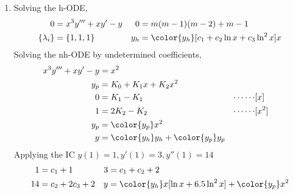 \begin{enumerate}
    \item Solving the h-ODE,
          \begin{align}
              0               & = x^{3}y''' + xy' - y                            &
              0               & = m(m-1) (m-2) + m - 1                             \\
              \{\lambda_{i}\} & = \{1, 1, 1\}                                    &
              y_{h}           & = \color{y_h} [c_1 + c_2 \ln x + c_3 \ln^{2}x] x
          \end{align}
          Solving the nh-ODE by undetermined coefficients,
          \begin{align}
              x^{3}y''' + xy' - y & = x^{2}                                       \\
              y_{p}               & = K_0 + K_1 x + K_2 x^{2}                     \\
              0                   & = K_1 - K_1                                 &
              \cdots\cdots        & [x]                                           \\
              1                   & = 2K_2 - K_2                                &
              \cdots\cdots        & [x^{2}]                                       \\
              y_{p}               & = \color{y_p} x^{2}                           \\
              y                   & = {\color{y_h} y_{h}} + {\color{y_p} y_{p}}
          \end{align}
          Applying the IC $ y(1) = 1, y'(1) = 3, y''(1) = 14 $
          \begin{align}
              1  & = c_1 + 1                                                    &
              3  & = c_1 + c_2 + 2                                                \\
              14 & = c_2 + 2c_3 + 2                                             &
              y  & = {\color{y_h} x[\ln x + 6.5\ln^{2}x]} + {\color{y_p} x^{2}}
          \end{align}
          \begin{figure}[H]
              \centering
          \end{figure}


\end{enumerate}
